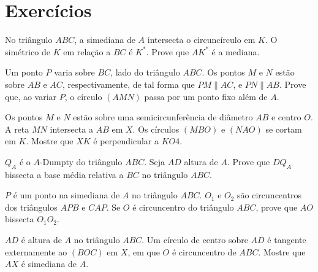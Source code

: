 \documentclass[10pt, a4paper]{article}
\begin{document}
	\section{Exercícios}
	\begin{prob}
		No triângulo $ABC$, a simediana de $A$ intersecta o circuncírculo em $K$. O simétrico de $K$ em relação a $BC$ é $K^*$. Prove que $AK^*$ é a mediana.
	\end{prob}
	\begin{prob}
		Um ponto $P$ varia sobre $BC$, lado do triângulo $ABC$. Os pontos $M$ e $N$ estão sobre $AB$ e $AC$, respectivamente, de tal forma que $PM \parallel AC$, e $PN \parallel AB$.
		Prove que, ao variar $P$, o círculo $(AMN)$ passa por um ponto fixo além de $A$.
	\end{prob}
	\begin{prob}
		Os pontos $M$ e $N$ estão sobre uma semicircunferência de diâmetro $AB$ e centro $O$. A reta $MN$ intersecta a $AB$ em $X$. Os círculos $(MBO)$ e $(NAO)$ se cortam em $K$. Mostre que $XK$ é perpendicular a $KO4$.
	\end{prob}
	\begin{prob}
		$Q_A$ é o $A$-Dumpty do triângulo $ABC$. Seja $AD$ altura de $A$. Prove que $DQ_A$ bissecta a base média relativa a $BC$ no triângulo $ABC$.
	\end{prob}
	\begin{prob}
		$P$ é um ponto na simediana de $A$ no triângulo $ABC$. $O_1$ e $O_2$ são circuncentros dos triângulos $APB$ e $CAP$. Se $O$ é circuncentro do triângulo $ABC$, prove que $AO$ bissecta $O_1O_2$.
	\end{prob}
	\begin{prob}
		$AD$ é altura de $A$ no triângulo $ABC$. Um círculo de centro sobre $AD$ é tangente externamente ao $(BOC)$ em $X$, em que $O$ é circuncentro de $ABC$. Mostre que $AX$ é simediana de $A$.
	\end{prob}
\end{document}

